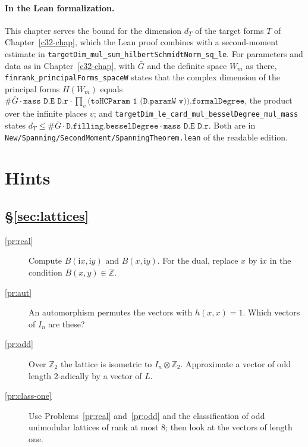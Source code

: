 \documentclass[reqno]{amsart}
\newcounter{chap}
\theoremstyle{definition}
\theoremstyle{plain}
\newcommand{\Z}{\mathbb{Z}}
\newcommand{\ii}{\mathrm{i}}
\begin{document}
\paragraph{In the Lean formalization.}
This chapter serves the bound for the dimension \(d_T\) of the target forms \(T\) of Chapter~\ref{c32-chap}, which the Lean proof \cite{GL} combines with a second-moment estimate in \texttt{targetDim\_mul\_sum\_hilbertSchmidtNorm\_sq\_le}.  For parameters and data as in Chapter~\ref{c32-chap}, with \(\bar G\) and the definite space \(W_m\) as there, \texttt{finrank\_principalForms\_spaceW} states that the complex dimension of the principal forms \(H(W_m)\) equals \(\#\bar G\cdot\texttt{mass D.E D.r}\cdot\prod_{v}\texttt{(toHCParam 1 (D.paramW v)).formalDegree}\), the product over the infinite places \(v\); and \texttt{targetDim\_le\_card\_mul\_besselDegree\_mul\_mass} states \(d_T\le\#\bar G\cdot\texttt{D.filling.besselDegree}\cdot\texttt{mass D.E D.r}\).  Both are in \texttt{New/Spanning/SecondMoment/SpanningTheorem.lean} of the readable edition.

\section*{Hints}

\subsection*{\S\ref{sec:lattices}}
\begin{description}
\item[\ref{pr:real}] Compute \(B(\ii x, \ii y)\) and \(B(x, \ii y)\).  For the dual, replace \(x\) by \(\ii x\) in the condition \(B(x,y) \in \Z\).
\item[\ref{pr:aut}] An automorphism permutes the vectors with \(h(x,x) = 1\).  Which vectors of \(I_n\) are these?
\item[\ref{pr:odd}] Over \(\Z_2\) the lattice is isometric to \(I_n \otimes \Z_2\).  Approximate a vector of odd length \(2\)-adically by a vector of \(L\).
\item[\ref{pr:class-one}] Use Problems~\ref{pr:real} and~\ref{pr:odd} and the classification of odd unimodular lattices of rank at most \(8\); then look at the vectors of length one.
\end{description}
\end{document}
